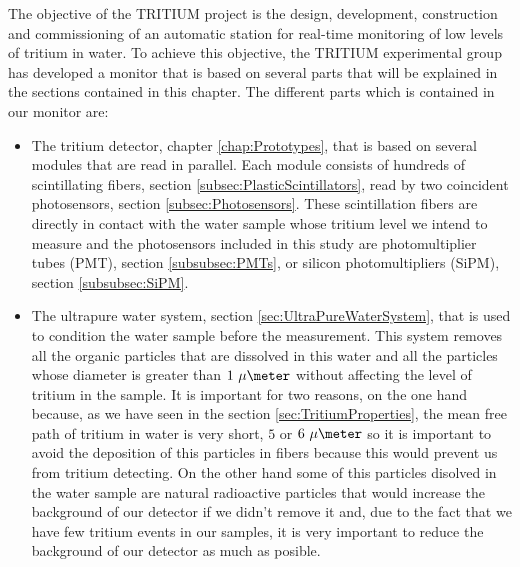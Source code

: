 The objective of the TRITIUM project is the design, development, construction and commissioning of an automatic station for real-time monitoring of low levels of tritium in water. To achieve this objective, the TRITIUM experimental group has developed a monitor that is based on several parts that will be explained in the sections contained in this chapter. The different parts which is contained in our monitor are:

\begin{itemize}

\item{} The tritium detector, chapter \ref{chap:Prototypes}, that is based on several modules that are read in parallel. Each module consists of hundreds of scintillating fibers, section \ref{subsec:PlasticScintillators}, read by two coincident photosensors, section \ref{subsec:Photosensors}. These scintillation fibers are directly in contact with the water sample whose tritium level we intend to measure and the photosensors included in this study are photomultiplier tubes (PMT), section \ref{subsubsec:PMTs}, or silicon photomultipliers (SiPM), section \ref{subsubsec:SiPM}.

\item{} The ultrapure water system, section \ref{sec:UltraPureWaterSystem}, that is used to condition the water sample before the measurement. This system removes all the organic particles that are dissolved in this water and all the particles whose diameter is greater than $1~\mu\meter$ without affecting the level of tritium in the sample. It is important for two reasons, on the one hand because, as we have seen in the section \ref{sec:TritiumProperties}, the mean free path of tritium in water is very short, $5$ or $6~\mu\meter$  so it is important to avoid the deposition of this particles in fibers because this would prevent us from tritium detecting. On the other hand some of this particles disolved in the water sample are natural radioactive particles that would increase the background of our detector if we didn't remove it and, due to the fact that we have few tritium events in our samples, it is very important to reduce the background of our detector as much as posible.


\end{itemize}

